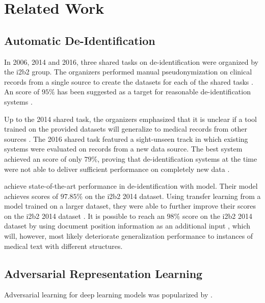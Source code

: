 
\section{Related Work}\label{sec:related}
%


\subsection{Automatic De-Identification}
In 2006, 2014 and 2016, three shared tasks on de-identification were organized by the i2b2 group.
%
The organizers performed manual pseudonymization on clinical records from a single source to create the datasets for each of the shared tasks \citep{stubbs2015annotating}.
%
An \fone score of $95\%$ has been suggested as a target for reasonable de-identification systems \citep{stubbs2015automated}.

%
Up to the 2014 shared task, the organizers emphasized that it is unclear if a tool trained on the provided datasets will generalize to medical records from other sources \citep{uzuner2007evaluating,stubbs2015automated}.
%
The 2016 shared task featured a sight-unseen track in which existing systems were evaluated on records from a new data source.
%
The best system achieved an \fone score of only $79\%$, proving that de-identification systems at the time were not able to deliver sufficient performance on completely new data \citep{stubbs2017identification}.

%
\citet{dernoncourt2017identification} achieve state-of-the-art performance in de-identification with  model.
%
Their model achieves \fone scores of $97.85\%$ on the i2b2 2014 dataset.
%
Using transfer learning from a model trained on a larger dataset, they were able to further improve their scores on the i2b2 2014 dataset \citep{lee2017transfer}.
%
It is possible to reach an $98\%$ \fone score on the i2b2 2014 dataset by using document position information as an additional input \citep{zhao2018leveraging}, which will, however, most likely deteriorate generalization performance to instances of medical text with different structures.

\subsection{Adversarial Representation Learning}
%
Adversarial learning for deep learning models was popularized by \citet{goodfellow2014generative}.
%


